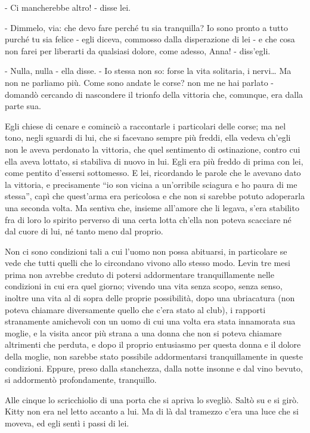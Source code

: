 - Ci mancherebbe altro! - disse lei. 

- Dimmelo, via: che devo fare perché tu sia tranquilla? Io sono pronto a tutto purché tu sia felice - egli diceva, commosso dalla disperazione di lei - e che cosa non farei per liberarti da qualsiasi dolore, come adesso, Anna! - diss'egli. 

- Nulla, nulla - ella disse. - Io stessa non so: forse la vita solitaria, i nervi\ldots{} Ma non ne parliamo più. Come sono andate le corse? non me ne hai parlato - domandò cercando di nascondere il trionfo della vittoria che, comunque, era dalla parte sua. 

Egli chiese di cenare e cominciò a raccontarle i particolari delle corse; ma nel tono, negli sguardi di lui, che si facevano sempre più freddi, ella vedeva ch'egli non le aveva perdonato la vittoria, che quel sentimento di ostinazione, contro cui ella aveva lottato, si stabiliva di nuovo in lui. Egli era più freddo di prima con lei, come pentito d'essersi sottomesso. E lei, ricordando le parole che le avevano dato la vittoria, e precisamente ``io son vicina a un'orribile sciagura e ho paura di me stessa'', capì che quest'arma era pericolosa e che non si sarebbe potuto adoperarla una seconda volta. Ma sentiva che, insieme all'amore che li legava, s'era stabilito fra di loro lo spirito perverso di una certa lotta ch'ella non poteva scacciare né dal cuore di lui, né tanto meno dal proprio. 

\label{xiii-6} 

Non ci sono condizioni tali a cui l'uomo non possa abituarsi, in particolare se vede che tutti quelli che lo circondano vivono allo stesso modo. Levin tre mesi prima non avrebbe creduto di potersi addormentare tranquillamente nelle condizioni in cui era quel giorno; vivendo una vita senza scopo, senza senso, inoltre una vita al di sopra delle proprie possibilità, dopo una ubriacatura (non poteva chiamare diversamente quello che c'era stato al club), i rapporti stranamente amichevoli con un uomo di cui una volta era stata innamorata sua moglie, e la visita ancor più strana a una donna che non si poteva chiamare altrimenti che perduta, e dopo il proprio entusiasmo per questa donna e il dolore della moglie, non sarebbe stato possibile addormentarsi tranquillamente in queste condizioni. Eppure, preso dalla stanchezza, dalla notte insonne e dal vino bevuto, si addormentò profondamente, tranquillo. 

Alle cinque lo scricchiolio di una porta che si apriva lo svegliò. Saltò su e si girò. Kitty non era nel letto accanto a lui. Ma di là dal tramezzo c'era una luce che si moveva, ed egli sentì i passi di lei. 

